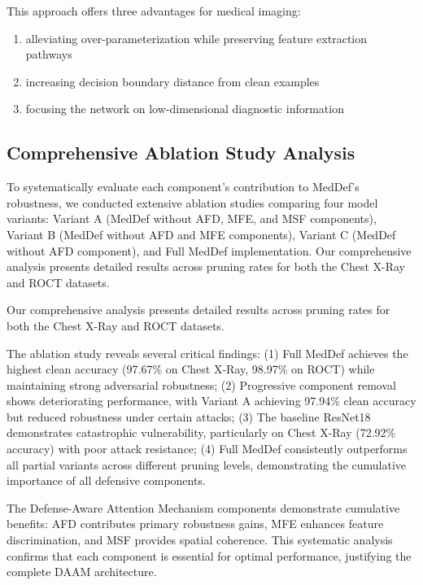 \documentclass[preprint,12pt]{elsarticle}
\begin{document}
This approach offers three advantages for medical imaging: 
\begin{enumerate}
    \item alleviating over-parameterization while preserving feature extraction pathways
    \item increasing decision boundary distance from clean examples  
    \item focusing the network on low-dimensional diagnostic information
\end{enumerate}

\subsection{Comprehensive Ablation Study Analysis}
To systematically evaluate each component's contribution to MedDef's robustness, we conducted extensive ablation studies comparing four model variants: Variant A (MedDef without AFD, MFE, and MSF components), Variant B (MedDef without AFD and MFE components), Variant C (MedDef without AFD component), and Full MedDef implementation. Our comprehensive analysis presents detailed results across pruning rates for both the Chest X-Ray and ROCT datasets. 

Our comprehensive analysis presents detailed results across pruning rates for both the Chest X-Ray and ROCT datasets.

The ablation study reveals several critical findings: (1) Full MedDef achieves the highest clean accuracy (97.67\% on Chest X-Ray, 98.97\% on ROCT) while maintaining strong adversarial robustness; (2) Progressive component removal shows deteriorating performance, with Variant A achieving 97.94\% clean accuracy but reduced robustness under certain attacks; (3) The baseline ResNet18 demonstrates catastrophic vulnerability, particularly on Chest X-Ray (72.92\% accuracy) with poor attack resistance; (4) Full MedDef consistently outperforms all partial variants across different pruning levels, demonstrating the cumulative importance of all defensive components.

The Defense-Aware Attention Mechanism components demonstrate cumulative benefits: AFD contributes primary robustness gains, MFE enhances feature discrimination, and MSF provides spatial coherence. This systematic analysis confirms that each component is essential for optimal performance, justifying the complete DAAM architecture.
\end{document}
